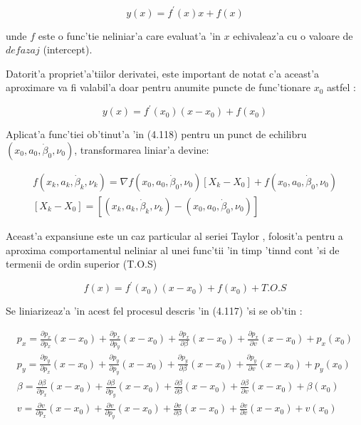 \documentclass[12pt,a4paper,twoside]{report}
\begin{document}
\begin{equation}
    y(x) = f^\prime (x) x + f(x)
\end{equation}

unde $f$ este o func'tie neliniar'a care evaluat'a 'in $x$ echivaleaz'a cu o valoare de $defazaj$ (intercept). 

\vspace{5px}

Datorit'a propriet'a'tiilor derivatei, este important de notat c'a aceast'a aproximare va fi valabil'a doar pentru anumite puncte de func'tionare $x_0$ astfel \cite{LinReg}:

\begin{equation}
    y(x) =  f^\prime (x_0) (x-x_0) + f(x_0)
\end{equation}

Aplicat'a func'tiei ob'tinut'a 'in (4.118) pentru un punct de echilibru $(x_0, a_0, \dot \beta_0, \nu_0)$, transformarea liniar'a devine:

\begin{gather}
     f(x_k, a_k, \dot \beta_k, \nu_k) = \nabla f(x_0, a_0, \dot \beta_0, \nu_0) [X_k - X_0] + f(x_0, a_0, \dot \beta_0, \nu_0) \\
     [X_k - X_0] = [(x_k, a_k, \dot \beta_k, \nu_k) - (x_0, a_0,\dot \beta_0, \nu_0)]
\end{gather}

Aceast'a expansiune este un caz particular al seriei Taylor \cite{LinReg}, folosit'a pentru a aproxima comportamentul neliniar al unei func'tii 'in timp 'tin\ia nd cont 'si de termenii de ordin superior (T.O.S)

\begin{equation}
     f(x) =  f^\prime (x_0) (x-x_0) + f(x_0) + T.O.S
\end{equation}

Se liniarizeaz'a 'in acest fel procesul descris 'in (4.117) 'si se ob'tin \cite{7952985}: 

\begin{gather}
p_x = \frac{\partial p_x}{\partial p_x} (x-x_0) +  \frac{\partial p_x}{\partial p_y} (x-x_0) +  \frac{\partial p_x}{\partial \beta} (x-x_0) +  \frac{\partial p_x}{\partial v} (x-x_0) + p_x (x_0) \\ 
p_y = \frac{\partial p_y}{\partial p_x} (x-x_0) +  \frac{\partial p_y}{\partial p_y} (x-x_0) +  \frac{\partial p_y}{\partial \beta} (x-x_0) +  \frac{\partial p_y}{\partial v} (x-x_0) + p_y (x_0) \\
\beta = \frac{\partial \beta}{\partial p_x} (x-x_0) +  \frac{\partial \beta}{\partial p_y} (x-x_0) +  \frac{\partial \beta}{\partial \beta} (x-x_0) +  \frac{\partial \beta}{\partial v} (x-x_0) + \beta(x_0) \\ 
v = \frac{\partial v}{\partial p_x} (x-x_0) +  \frac{\partial v}{\partial p_y} (x-x_0) +  \frac{\partial v}{\partial \beta} (x-x_0) +  \frac{\partial v}{\partial v} (x-x_0) + v (x_0)
\end{gather}
\end{document}
